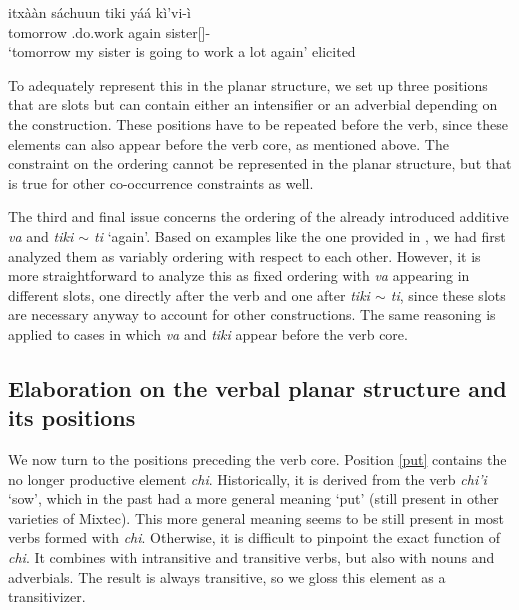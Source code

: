 \documentclass[output=paper]{langscibook}
\begin{document}
\ea \label{ex:yaatiki}
    \ea
    \gll itxààn sáchuun tiki yáá kì'vi-ì \\
		  tomorrow \Pot.do.work again \Intens{} sister[\F{}]-\Fsg{} \\
	\glt `tomorrow my sister is going to work a lot again' \hfill elicited
 \z
\z

To adequately represent this in the planar structure, we set up three positions that are slots but can contain either an intensifier or an adverbial depending on the construction. These positions have to be repeated before the verb, since these elements can also appear before the verb core, as mentioned above.
The constraint on the ordering cannot be represented in the planar structure, but that is true for other co-occurrence constraints as well.

The third and final issue concerns the ordering of the already introduced additive \textit{va} and \textit{tiki $\sim$ ti} `again'. Based on examples like the one provided in , we had first analyzed them as variably ordering with respect to each other.
However, it is more straightforward to analyze this as fixed ordering with \textit{va} appearing in different slots, one directly after the verb and one after \textit{tiki $\sim$ ti}, since these slots are necessary anyway to account for other constructions.
The same reasoning is applied to cases in which \textit{va} and \textit{tiki} appear before the verb core.

\ea \label{ex:tikielicited}
 \z
\z


\subsection{Elaboration on the verbal planar structure and its positions} %
\label{sub:positions}

We now turn to the positions preceding the verb core.
Position \ref{put} contains the no longer productive element \textit{chi}. Historically, it is derived from the verb \textit{chi'i} `sow', which in the past had a more general meaning `put' (still present in other varieties of Mixtec). 
This more general meaning seems to be still present in most verbs formed with \textit{chi}. Otherwise, it is difficult to pinpoint the exact function of \textit{chi}. It combines with intransitive and transitive verbs, but also with nouns and adverbials. The result is always transitive, so we gloss this element as a transitivizer. 
\end{document}
